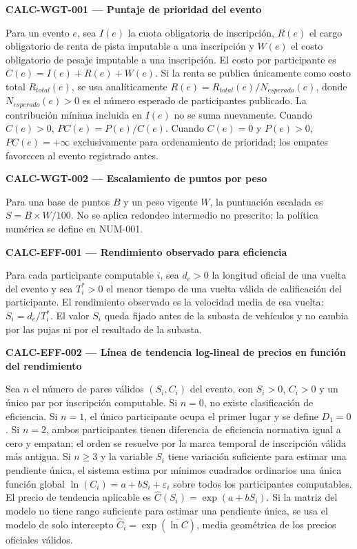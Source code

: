 \documentclass[10pt,letterpaper]{article}
\begin{document}
\noindent\textbf{CALC-WGT-001 --- Puntaje de prioridad del evento}\par
Para un evento $e$, sea $I(e)$ la cuota obligatoria de inscripción, $R(e)$ el cargo obligatorio de renta de pista imputable a una inscripción y $W(e)$ el costo obligatorio de pesaje imputable a una inscripción. El costo por participante es $C(e)=I(e)+R(e)+W(e)$. Si la renta se publica únicamente como costo total $R_{total}(e)$, se usa analíticamente $R(e)=R_{total}(e)/N_{esperado}(e)$, donde $N_{esperado}(e)>0$ es el número esperado de participantes publicado. La contribución mínima incluida en $I(e)$ no se suma nuevamente. Cuando $C(e)>0$, $PC(e)=P(e)/C(e)$. Cuando $C(e)=0$ y $P(e)>0$, $PC(e)=+\infty$ exclusivamente para ordenamiento de prioridad; los empates favorecen al evento registrado antes.\par\vspace{0.5em}
\noindent\textbf{CALC-WGT-002 --- Escalamiento de puntos por peso}\par
Para una base de puntos $B$ y un peso vigente $W$, la puntuación escalada es $S=B\times W/100$. No se aplica redondeo intermedio no prescrito; la política numérica se define en NUM-001.\par\vspace{0.5em}
\noindent\textbf{CALC-EFF-001 --- Rendimiento observado para eficiencia}\par
Para cada participante computable $i$, sea $d_e>0$ la longitud oficial de una vuelta del evento y sea $T_i^*>0$ el menor tiempo de una vuelta válida de calificación del participante. El rendimiento observado es la velocidad media de esa vuelta: $S_i=d_e/T_i^*$. El valor $S_i$ queda fijado antes de la subasta de vehículos y no cambia por las pujas ni por el resultado de la subasta.\par\vspace{0.5em}
\noindent\textbf{CALC-EFF-002 --- Línea de tendencia log-lineal de precios en función del rendimiento}\par
Sea $n$ el número de pares válidos $(S_i,C_i)$ del evento, con $S_i>0$, $C_i>0$ y un único par por inscripción computable. Si $n=0$, no existe clasificación de eficiencia. Si $n=1$, el único participante ocupa el primer lugar y se define $D_1=0$. Si $n=2$, ambos participantes tienen diferencia de eficiencia normativa igual a cero y empatan; el orden se resuelve por la marca temporal de inscripción válida más antigua. Si $n\ge3$ y la variable $S_i$ tiene variación suficiente para estimar una pendiente única, el sistema estima por mínimos cuadrados ordinarios una única función global $\ln(C_i)=a+bS_i+\varepsilon_i$ sobre todos los participantes computables. El precio de tendencia aplicable es $\widehat{C}(S_i)=\exp(a+bS_i)$. Si la matriz del modelo no tiene rango suficiente para estimar una pendiente única, se usa el modelo de solo intercepto $\widehat{C}_i=\exp(\overline{\ln C})$, media geométrica de los precios oficiales válidos.\par\vspace{0.5em}
\end{document}
